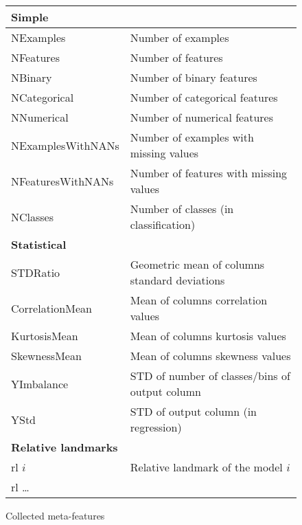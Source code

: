 \documentclass[hidelinks, english]{mvi-report}
\begin{document}
\begin{figure*}[t]
\center
    \begin{tabular}[c]{l l}
    \textbf{Simple}   & \\
    \hline
    NExamples         & Number of examples                      \\
    NFeatures         & Number of features                      \\
    NBinary           & Number of binary features               \\
    NCategorical      & Number of categorical features          \\
    NNumerical        & Number of numerical features            \\
    NExamplesWithNANs & Number of examples with missing values  \\
    NFeaturesWithNANs & Number of features with missing values  \\
    NClasses          & Number of classes (in classification)   \\
    \hline
    \hline
    \textbf{Statistical}   & \\
    \hline
    STDRatio          & Geometric mean of columns standard deviations   \\
    CorrelationMean   & Mean of columns correlation values              \\
    KurtosisMean      & Mean of columns kurtosis values                 \\
    SkewnessMean      & Mean of columns skewness values                 \\
    YImbalance        & STD of number of classes/bins of output column  \\
    YStd              & STD of output column (in regression)            \\
    \hline
    \hline
    \textbf{Relative landmarks}   & \\
    \hline
    rl $i$              & Relative landmark of the model $i$ \\
    rl \dots            & \\
    \end{tabular}

\caption{Collected meta-features}
\label{fig:meta-features}
\end{figure*}
\end{document}
